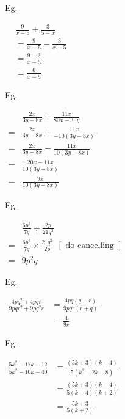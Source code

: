 \documentclass[twocolumn]{article}
\begin{document}
\bigskip 

\noindent 
Eg. 

\noindent 
$
\begin{aligned}
	& \frac{9}{x-5}+\frac{3}{5-x} \\
	& =\frac{9}{x-5}-\frac{3}{x-5} \\
	& =\frac{9-3}{x-5} \\
	& =\frac{6}{x-5}
\end{aligned}
$

\bigskip 

\noindent 
Eg. 

\noindent 
$\begin{aligned} & \frac{2 x}{3 y-8 x}+\frac{11 x}{80 x-30 y} \\ = & \frac{2 x}{3 y-8 x}+\frac{11 x}{-10(3 y-8 x)} \\ = & \frac{2 x}{3 y-8 x}-\frac{11 x}{10(3 y-8 x)} \\ = & \frac{20 x-11 x}{10(3 y-8 x)} \\ = & \frac{9 x}{10(3 y-8 x)}\end{aligned}$

\bigskip 

\noindent 
Eg. 

\noindent 
$\begin{aligned} & \frac{6 p^3}{7 q} \div \frac{2 p}{21 q^2} \\ = & \frac{6 p^3}{7 q} \times \frac{21 q^2}{2 p} \ \ [\text { do cancelling }] \\ = & 9 p^2 q\end{aligned}$

\bigskip 

\noindent 
Eg. 

\noindent 
$\begin{aligned} \frac{4 p q^2+4 p q r}{9 p q r^2+9 p q^2 r} & =\frac{4 p q(q+r)}{9 p q r(r+q)} \\ & =\frac{4}{9 r}\end{aligned}$

\bigskip 

\noindent 
Eg. 

\noindent 
$\begin{aligned} \frac{5 k^2-17 k-12}{5 k^2-10 k-40} & =\frac{(5 k+3)(k-4)}{5\left(k^2-2 k-8\right)} \\ & =\frac{(5 k+3)(k-4)}{5(k-4)(k+2)} \\ & =\frac{5 k+3}{5(k+2)}\end{aligned}$

\bigskip 
\end{document}
